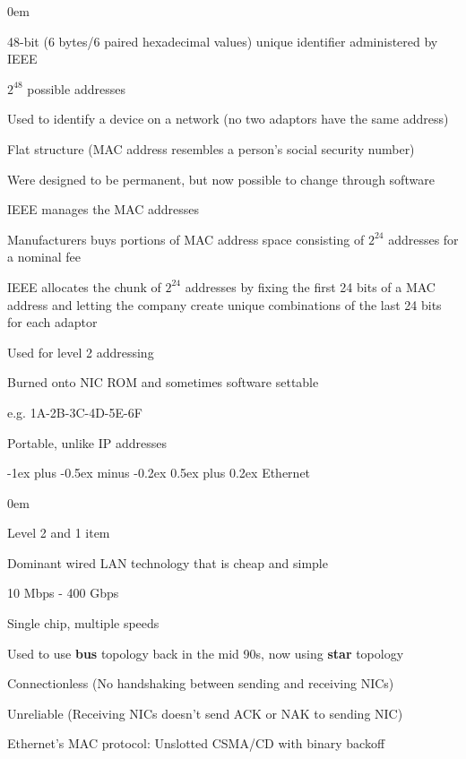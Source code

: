 \documentclass[letterpaper,8pt]{extarticle}
\makeatletter
\renewcommand{\subsection}{\@startsection{subsection}{2}{0mm}%
  {-1ex plus -0.5ex minus -0.2ex}%
  {0.5ex plus 0.2ex}%
{\color{h2}\normalfont\fontsize{6}{6}\selectfont\bfseries}}
\let\olditemize\itemize \let\endolditemize\enditemize
\renewenvironment{itemize}{\olditemize \itemsep0em}{\endolditemize}
\makeatother
\begin{document}
\begin{multicols*}{5}
  \begin{itemize}
    \item 48-bit (6 bytes/6 paired hexadecimal values) unique identifier administered by IEEE
    \item $2^{48}$ possible addresses
    \item Used to identify a device on a network (no two adaptors have the same address)
    \item Flat structure (MAC address resembles a person's social security number)
    \item Were designed to be permanent, but now possible to change through software
    \item IEEE manages the MAC addresses
    \item Manufacturers buys portions of MAC address space consisting of $2^{24}$ addresses for a nominal fee
    \item IEEE allocates the chunk of $2^{24}$ addresses by fixing the first 24 bits of a MAC address and letting the company create unique combinations of the last 24 bits for each adaptor
    \item Used for level 2 addressing
    \item Burned onto NIC ROM and sometimes software settable
    \item e.g. 1A-2B-3C-4D-5E-6F

    \item Portable, unlike IP addresses
  \end{itemize}

  \subsection{Ethernet}

  \begin{itemize}
    \item Level 2 and 1 item
    \item Dominant wired LAN technology that is cheap and simple
    \item 10 Mbps - 400 Gbps
    \item Single chip, multiple speeds
    \item Used to use \textbf{bus} topology back in the mid 90s, now using \textbf{star} topology
    \item Connectionless (No handshaking between sending and receiving NICs)
    \item Unreliable (Receiving NICs doesn't send ACK or NAK to sending NIC)
    \item Ethernet's MAC protocol: Unslotted CSMA/CD with binary backoff
  \end{itemize}


\end{multicols*}
\end{document}
